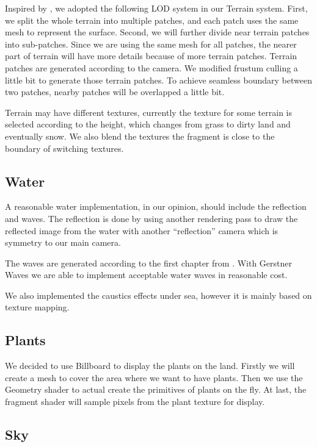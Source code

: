\documentclass[10pt,twocolumn]{article}
\begin{document}
Inspired by \cite{CDLOD}, we adopted the following LOD system in our Terrain
system. First, we split the whole terrain into multiple patches, and each
patch uses the same mesh to represent the surface. Second, we will further
divide near terrain patches into sub-patches. Since we are using the same mesh
for all patches, the nearer part of terrain will have more details because of
more terrain patches. Terrain patches are generated according to the camera.
We modified frustum culling a little bit to generate those terrain patches. To
achieve seamless boundary between two patches, nearby patches will be
overlapped a little bit.

Terrain may have different textures, currently the texture for some terrain is
selected according to the height, which changes from grass to dirty land and
eventually snow. We also blend the textures the fragment is close to the
boundary of switching textures.

\subsection{Water}

A reasonable water implementation, in our opinion, should include the
reflection and waves. The reflection is done by using another rendering pass
to draw the reflected image from the water with another ``reflection'' camera
which is symmetry to our main camera.

The waves are generated according to the first chapter from
\cite{fernando2001gpu}. With Gerstner Waves we are able to implement
acceptable water waves in reasonable cost.

We also implemented the caustics effects under sea, however it is mainly based
on texture mapping.

\subsection{Plants}

We decided to use Billboard to display the plants on the land. Firstly we will
create a mesh to cover the area where we want to have plants. Then we use the
Geometry shader to actual create the primitives of plants on the fly. At last,
the fragment shader will sample pixels from the plant texture for display.

\subsection{Sky}
\end{document}
